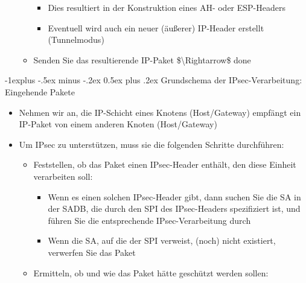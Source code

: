 \documentclass[a4paper]{article}
\makeatletter
\renewcommand{\subsection}{\@startsection{subsection}{2}{0mm}%
 {-1explus -.5ex minus -.2ex}%
 {0.5ex plus .2ex}%
 {\normalfont\normalsize\bfseries}}
\makeatother
\begin{document}
\begin{multicols}{3}
\begin{itemize}
\begin{itemize}
                        \begin{itemize}
                            \item
                                  Dies resultiert in der Konstruktion eines AH- oder ESP-Headers
                            \item
                                  Eventuell wird auch ein neuer (äußerer) IP-Header erstellt
                                  (Tunnelmodus)
                        \end{itemize}
                  \item
                        Senden Sie das resultierende IP-Paket \$\textbackslash Rightarrow\$
                        done
              \end{itemize}
    \end{itemize}


    \subsection{Grundschema der IPsec-Verarbeitung: Eingehende
        Pakete}

    \begin{itemize}
        \item
              Nehmen wir an, die IP-Schicht eines Knotens (Host/Gateway) empfängt
              ein IP-Paket von einem anderen Knoten (Host/Gateway)
        \item
              Um IPsec zu unterstützen, muss sie die folgenden Schritte durchführen:

              \begin{itemize}
                  \item
                        Feststellen, ob das Paket einen IPsec-Header enthält, den diese
                        Einheit verarbeiten soll:

                        \begin{itemize}
                            \item
                                  Wenn es einen solchen IPsec-Header gibt, dann suchen Sie die SA in
                                  der SADB, die durch den SPI des IPsec-Headers spezifiziert ist,
                                  und führen Sie die entsprechende IPsec-Verarbeitung durch
                            \item
                                  Wenn die SA, auf die der SPI verweist, (noch) nicht existiert,
                                  verwerfen Sie das Paket
                        \end{itemize}
                  \item
                        Ermitteln, ob und wie das Paket hätte geschützt werden sollen:


\end{itemize}
\end{itemize}
\end{multicols}
\end{document}

